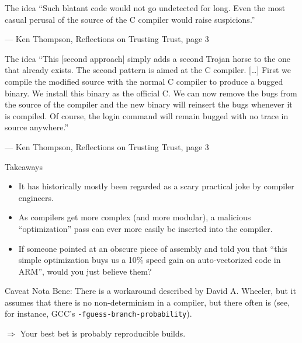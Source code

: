 \documentclass[aspectratio=169]{beamer}
\begin{document}
  \begin{frame}{The idea}
    “Such blatant code would not go undetected for long. Even the most casual
     perusal of the source of the C compiler would raise suspicions.” 

     \indent — Ken Thompson, Reflections on Trusting Trust, page 3
  \end{frame}
  \begin{frame}{The idea}
    “This [second approach] simply adds a second Trojan horse to the one that
     already exists. The second pattern is aimed at the C compiler. [\ldots] First
     we compile the modified source with the normal C compiler to produce a
     bugged binary. We install this binary as the official C. We can now remove
     the bugs from the source of the compiler and the new binary will reinsert
     the bugs whenever it is compiled. Of course, the login command will remain
     bugged with no trace in source anywhere.”

     \indent — Ken Thompson, Reflections on Trusting Trust, page 3
  \end{frame}
  \begin{frame}{Takeaways}
    \begin{itemize}
      \item It has historically mostly been regarded as a scary practical joke
            by compiler engineers.
      \item As compilers get more complex (and more modular), a malicious
            “optimization” pass can ever more easily be inserted into the
            compiler.
      \item If someone pointed at an obscure piece of assembly and told you
            that “this simple optimization buys us a 10\% speed gain on
            auto-vectorized code in ARM”, would you just believe them?
    \end{itemize}
  \end{frame}
  \begin{frame}{Caveat}
    Nota Bene: There is a workaround described by David A. Wheeler, but it
    assumes that there is no non-determinism in a compiler, but there often is
    (see, for instance, GCC’s \texttt{-fguess-branch-probability}).

    $\Rightarrow$ Your best bet is probably reproducible builds.
  \end{frame}
\end{document}
